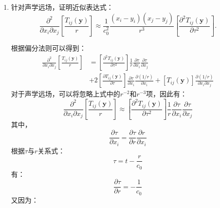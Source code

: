 \begin{enumerate}
    \item 针对声学远场，证明近似表达式：
        \[ \frac{\partial^{2}}{\partial x_{i} \partial x_{j}}\left[\frac{T_{i j}(\boldsymbol{y})}{r}\right] \approx \frac{1}{c_{0}^{2}} \frac{\left(x_{i}-y_{i}\right)\left(x_{j}-y_{j}\right)}{r^{3}}\left[\frac{\partial^{2} T_{i j}(\boldsymbol{y})}{\partial \tau^{2}}\right]. \]

        根据偏分法则可以得到：
        \begin{equation}
            \begin{aligned}
                \frac{\partial^{2}}{\partial x_{i} \partial x_{j}}\left[\frac{T_{i j}(\boldsymbol{y})}{r}\right]
                &= \left[\frac{\partial^{2} T_{i j}(\mathbf{y})}{\partial \tau^{2}}\right] \frac{1}{r} \frac{\partial \tau}{\partial x_{i}} \frac{\partial \tau}{\partial x_{j}} \\
                &+ 2\left[\frac{\partial T_{i j}(\mathbf{y})}{\partial \tau}\right] \frac{\partial \tau}{\partial x_{i}} \frac{\partial(1 / r)}{\partial x_{i}}+\left[T_{i j}(\mathbf{y})\right] \frac{\partial(1 / r)}{\partial x_{i} \partial x_{j}}
            \end{aligned}
        \end{equation}
        对于声学远场，可以将忽略上式中的\(r^{-2}\)和\(r^{-3}\)项，因此有：
        \begin{equation}
            \label{eq:equation ignore r-2 r-3}
            \frac{\partial^{2}}{\partial x_{i} \partial x_{j}}\left[\frac{T_{i j}(\boldsymbol{y})}{r}\right]
            \approx \left[\frac{\partial^{2} T_{i j}(\mathbf{y})}{\partial \tau^{2}}\right] \frac{1}{r} \frac{\partial \tau}{\partial x_{i}} \frac{\partial \tau}{\partial x_{j}}
        \end{equation}
        其中，
        \begin{equation}
            \frac{\partial \tau}{\partial x_{i}}
            = \frac{\partial \tau}{\partial r} \frac{\partial r}{\partial x_{i}}
        \end{equation}
        根据\(\tau\)与\(r\)关系式：
        \begin{equation}
            \tau = t - \frac{r}{c_{0}}
        \end{equation}
        有：
        \begin{equation}
            \frac{\partial \tau}{\partial r}
            = - \frac{1}{c_{0}}
        \end{equation}
        又因为：
        \begin{equation}

\end{equation}
\end{enumerate}
